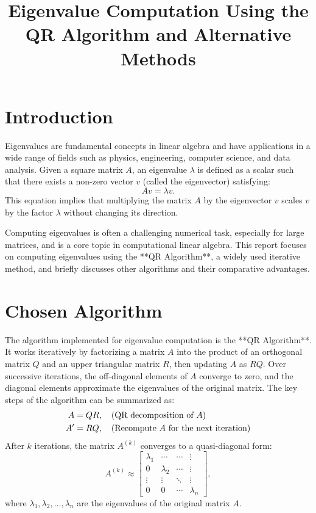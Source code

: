 \documentclass[12pt]{article}
\title{Eigenvalue Computation Using the QR Algorithm and Alternative Methods}
\author{}
\date{}
\begin{document}
\maketitle

\section*{Introduction}
Eigenvalues are fundamental concepts in linear algebra and have applications in a wide range of fields such as physics, engineering, computer science, and data analysis. Given a square matrix \( A \), an eigenvalue \( \lambda \) is defined as a scalar such that there exists a non-zero vector \( v \) (called the eigenvector) satisfying:
\begin{equation}
    A v = \lambda v.
\end{equation}
This equation implies that multiplying the matrix \( A \) by the eigenvector \( v \) scales \( v \) by the factor \( \lambda \) without changing its direction. 

Computing eigenvalues is often a challenging numerical task, especially for large matrices, and is a core topic in computational linear algebra. This report focuses on computing eigenvalues using the **QR Algorithm**, a widely used iterative method, and briefly discusses other algorithms and their comparative advantages.

\section*{Chosen Algorithm}
The algorithm implemented for eigenvalue computation is the **QR Algorithm**. It works iteratively by factorizing a matrix \( A \) into the product of an orthogonal matrix \( Q \) and an upper triangular matrix \( R \), then updating \( A \) as \( RQ \). Over successive iterations, the off-diagonal elements of \( A \) converge to zero, and the diagonal elements approximate the eigenvalues of the original matrix.
The key steps of the algorithm can be summarized as:
\begin{align}
    A &= QR, \quad \text{(QR decomposition of \( A \))} \\
    A' &= RQ, \quad \text{(Recompute \( A \) for the next iteration)}
\end{align}
After \( k \) iterations, the matrix \( A^{(k)} \) converges to a quasi-diagonal form:
\begin{equation}
    A^{(k)} \approx 
    \begin{bmatrix}
        \lambda_1 & \cdots & \cdots & \vdots \\
        0 & \lambda_2 & \cdots & \vdots \\
        \vdots & \vdots & \ddots & \vdots \\
        0 & 0 & \cdots & \lambda_n
    \end{bmatrix},
\end{equation}
where \( \lambda_1, \lambda_2, \dots, \lambda_n \) are the eigenvalues of the original matrix \( A \).
\end{document}
